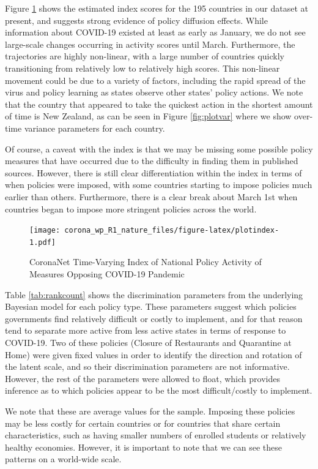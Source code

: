\documentclass[
]{article}
\begin{document}
Figure \ref{fig:plotindex} shows the estimated index scores for the 195 countries in our dataset at present, and suggests strong evidence of policy diffusion effects. While information about COVID-19 existed at least as early as January, we do not see large-scale changes occurring in activity scores until March. Furthermore, the trajectories are highly non-linear, with a large number of countries quickly transitioning from relatively low to relatively high scores. This non-linear movement could be due to a variety of factors, including the rapid spread of the virus and policy learning as states observe other states' policy actions. We note that the country that appeared to take the quickest action in the shortest amount of time is New Zealand, as can be seen in Figure \ref{fig:plotvar} where we show over-time variance parameters for each country.

Of course, a caveat with the index is that we may be missing some possible policy measures that have occurred due to the difficulty in finding them in published sources. However, there is still clear differentiation within the index in terms of when policies were imposed, with some countries starting to impose policies much earlier than others. Furthermore, there is a clear break about March 1st when countries began to impose more stringent policies across the world.

\begin{figure}
\centering
\texttt{[image: corona\_wp\_R1\_nature\_files/figure-latex/plotindex-1.pdf]}
\caption{\label{fig:plotindex}CoronaNet Time-Varying Index of National Policy Activity of Measures Opposing COVID-19 Pandemic}
\end{figure}

Table \ref{tab:rankcount} shows the discrimination parameters from the underlying Bayesian model for each policy type. These parameters suggest which policies governments find relatively difficult or costly to implement, and for that reason tend to separate more active from less active states in terms of response to COVID-19. Two of these policies (Closure of Restaurants and Quarantine at Home) were given fixed values in order to identify the direction and rotation of the latent scale, and so their discrimination parameters are not informative. However, the rest of the parameters were allowed to float, which provides inference as to which policies appear to be the most difficult/costly to implement.

We note that these are average values for the sample. Imposing these policies may be less costly for certain countries or for countries that share certain characteristics, such as having smaller numbers of enrolled students or relatively healthy economies. However, it is important to note that we can see these patterns on a world-wide scale.
\end{document}
